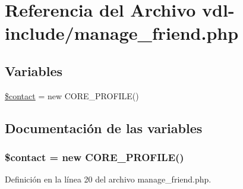 \hypertarget{manage__friend_8php}{\section{Referencia del Archivo vdl-\/include/manage\-\_\-friend.php}
\label{manage__friend_8php}
}
\subsection*{Variables}
\begin{DoxyCompactItemize}
\item 
\hyperlink{manage__friend_8php_afd33e8d1f281f29797152c06814a07bf}{\$contact} = new C\-O\-R\-E\-\_\-\-P\-R\-O\-F\-I\-L\-E()
\end{DoxyCompactItemize}


\subsection{Documentación de las variables}
\hypertarget{manage__friend_8php_afd33e8d1f281f29797152c06814a07bf}{
\subsubsection[{\$contact}]{\setlength{\rightskip}{0pt plus 5cm}\$contact = new C\-O\-R\-E\-\_\-\-P\-R\-O\-F\-I\-L\-E()}}\label{manage__friend_8php_afd33e8d1f281f29797152c06814a07bf}


Definición en la línea 20 del archivo manage\-\_\-friend.\-php.

